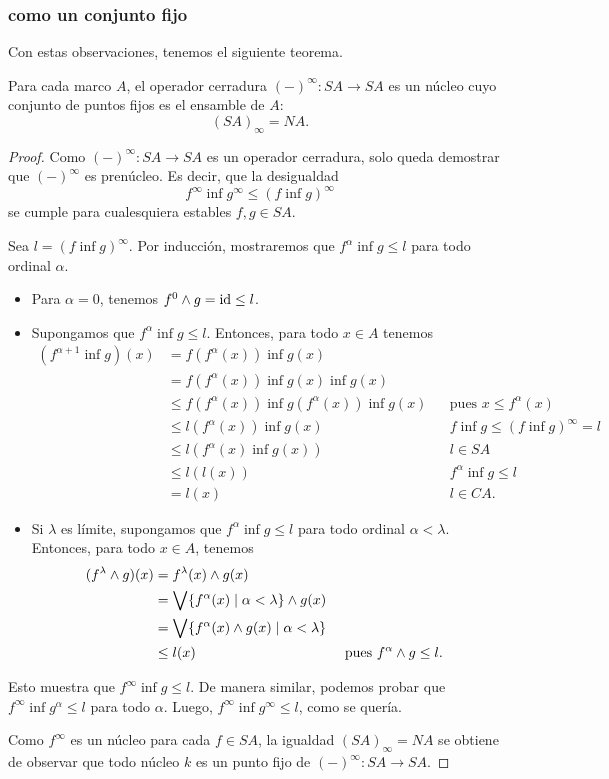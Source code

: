 \subsubsection{ como un conjunto fijo}
Con estas observaciones, tenemos el siguiente teorema.
\begin{thm}
  Para cada marco $A$, el operador cerradura $({-})^\infty:SA\to
  SA$ es un núcleo cuyo conjunto de puntos fijos es el ensamble
  de $A$:
  \[
    (SA)_\infty = NA
  .\]
\end{thm}
\begin{proof}
  Como $({-})^\infty:SA\to SA$ es un operador cerradura,
  solo queda demostrar que $(-)^\infty$ es prenúcleo.
  Es decir, que la desigualdad
  \[
    f^\infty \inf g^\infty \leq (f\inf g)^\infty
  \]
  se cumple para cualesquiera estables $f,g\in SA$.

  Sea $l=(f \inf g)^\infty$.
  Por inducción, mostraremos que $f^\alpha\inf g\leq l$ para todo
  ordinal $\alpha$.
  \begin{itemize}
    \item Para $\alpha=0$, tenemos $f^0\wedge g=\mathrm{id} \leq l$.
    \item Supongamos que $f^\alpha\inf g\leq l$.
    Entonces, para todo $x\in A$ tenemos
    \begin{align*}
      (f^{\alpha+1}\inf g)(x)
      &= f(f^\alpha(x)) \inf g(x) \\
      &= f(f^\alpha(x)) \inf g(x) \inf g(x) \\
      &\leq f(f^\alpha(x)) \inf g(f^\alpha(x)) \inf g(x)
        && \text{pues } x\leq f^\alpha(x) \\
      &\leq l(f^\alpha(x)) \inf g(x) && f\inf g\leq (f\inf
      g)^\infty =l \\
      &\leq l(f^\alpha(x) \inf g(x)) && l\in SA \\
      &\leq l(l(x)) && f^\alpha\inf g\leq l \\
      &= l(x) && l\in CA.
    \end{align*}
    \item
    Si $\lambda$ es límite, supongamos que $f^\alpha\inf g\leq l$
    para todo ordinal $\alpha <\lambda$.
    Entonces, para todo $x\in A$, tenemos
    \begin{align*}
      (f^\lambda\wedge g)(x)
      &= f^\lambda(x) \wedge g(x) \\
      &= \bigvee\{f^\alpha(x) \mid \alpha<\lambda\} \wedge g(x) \\
      &= \bigvee\{f^\alpha(x)\wedge g(x) \mid \alpha<\lambda\} \\
      &\leq l(x) && \text{ pues } f^\alpha\wedge g\leq l.
    \end{align*}
  \end{itemize}
  Esto muestra que $f^\infty \inf g\leq l$.
  De manera similar, podemos probar que $f^\infty \inf
  g^\alpha\leq l$ para todo $\alpha$.
  Luego, $f^\infty \inf g^\infty \leq l$, como se quería.

  Como $f^\infty$ es un núcleo para cada $f\in SA$, la
  igualdad $(SA)_\infty=NA$ se obtiene de observar que todo
  núcleo $k$ es un punto fijo de $({-})^\infty:SA\to SA$.
\end{proof}

